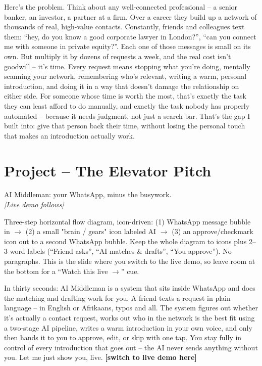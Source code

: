 \documentclass[11pt]{article}
\begin{document}
\begin{scriptbox}
Here's the problem. Think about any well-connected professional -- a senior banker, an
investor, a partner at a firm. Over a career they build up a network of thousands of
real, high-value contacts. Constantly, friends and colleagues text them: ``hey, do you
know a good corporate lawyer in London?'', ``can you connect me with someone in private
equity?''. Each one of those messages is small on its own. But multiply it by dozens of
requests a week, and the real cost isn't goodwill -- it's time. Every request means
stopping what you're doing, mentally scanning your network, remembering who's relevant,
writing a warm, personal introduction, and doing it in a way that doesn't damage the
relationship on either side. For someone whose time is worth the most, that's exactly
the task they can least afford to do manually, and exactly the task nobody has properly
automated -- because it needs judgment, not just a search bar. That's the gap I built
into: give that person back their time, without losing the personal touch that makes
an introduction actually work.
\end{scriptbox}

\section{Project -- The Elevator Pitch}

\begin{onslide}
AI Middleman: your WhatsApp, minus the busywork.\\
\textit{[Live demo follows]}
\end{onslide}

\begin{visual}
Three-step horizontal flow diagram, icon-driven: (1) WhatsApp message bubble in $\to$
(2) a small "brain / gears" icon labeled AI $\to$ (3) an approve/checkmark icon out to a
second WhatsApp bubble. Keep the whole diagram to icons plus 2--3 word labels
(``Friend asks'', ``AI matches \& drafts'', ``You approve''). No paragraphs. This is the
slide where you switch to the live demo, so leave room at the bottom for a
``Watch this live $\to$'' cue.
\end{visual}

\begin{scriptbox}
In thirty seconds: AI Middleman is a system that sits inside WhatsApp and does the
matching and drafting work for you. A friend texts a request in plain language -- in
English or Afrikaans, typos and all. The system figures out whether it's actually a
contact request, works out who in the network is the best fit using a two-stage
AI pipeline, writes a warm introduction in your own voice, and only then hands it to you
to approve, edit, or skip with one tap. You stay fully in control of every introduction
that goes out -- the AI never sends anything without you. Let me just show you, live.
\textbf{[switch to live demo here]}
\end{scriptbox}
\end{document}
